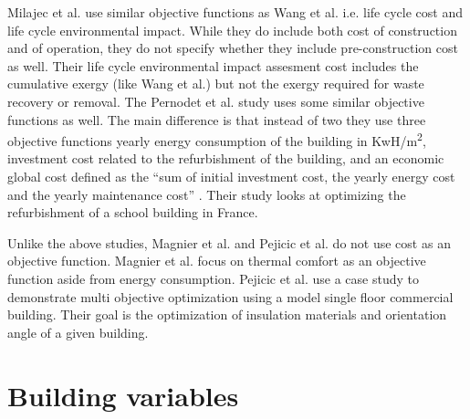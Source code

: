 Milajec et al. use similar objective functions as Wang et al. i.e. life cycle cost and life cycle environmental impact. While they do include both cost of construction and of operation, they do not specify whether they include pre-construction cost as well. Their life cycle environmental impact assesment cost includes the cumulative exergy (like Wang et al.) but not the exergy required for waste recovery or removal. The Pernodet et al. study uses some similar objective functions as well. The main difference is that instead of two they use three objective functions \textemdash yearly energy consumption of the building in KwH/m\textsuperscript{2}, investment cost related to the refurbishment of the building, and an economic global cost defined as the ``sum of initial investment cost, the yearly energy cost and the yearly maintenance cost'' \cite{Pernodet2009}. Their study looks at optimizing the refurbishment of a school building in France.

Unlike the above studies, Magnier et al. and Pejicic et al. do not use cost as an objective function. Magnier et al. focus on thermal comfort as an objective function aside from energy consumption. Pejicic et al. use a case study to demonstrate multi objective optimization using a model single floor commercial building. Their goal is the optimization of insulation materials and orientation angle of a given building. 


\section{Building variables}\label{sec:variables}

